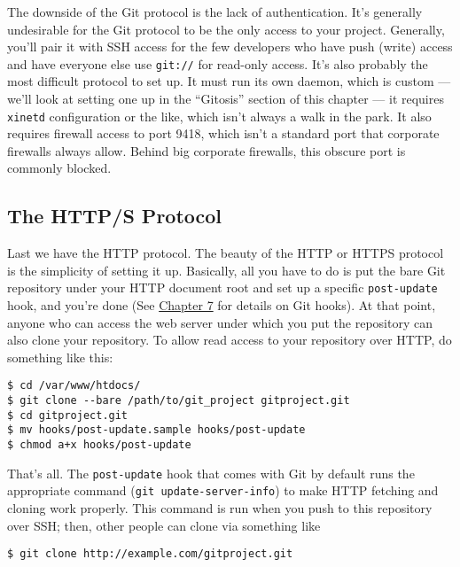 \documentclass[a4paper]{book}
\newcommand{\prechap}{Chapter }
\newcommand{\postchap}{}
\newcommand{\chapref}[1]{\hyperref[chap:#1]{\prechap #1\postchap}}
\begin{document}
The downside of the Git protocol is the lack of authentication. It's generally undesirable for the Git protocol to be the only access to your project. Generally, you'll pair it with SSH access for the few developers who have push (write) access and have everyone else use \texttt{git://} for read-only access. It's also probably the most difficult protocol to set up. It must run its own daemon, which is custom --- we'll look at setting one up in the “Gitosis” section of this chapter --- it requires \texttt{xinetd} configuration or the like, which isn't always a walk in the park. It also requires firewall access to port 9418, which isn't a standard port that corporate firewalls always allow. Behind big corporate firewalls, this obscure port is commonly blocked.

\subsection{The HTTP/S Protocol}\label{the-https-protocol}

Last we have the HTTP protocol. The beauty of the HTTP or HTTPS protocol is the simplicity of setting it up. Basically, all you have to do is put the bare Git repository under your HTTP document root and set up a specific \texttt{post-update} hook, and you're done (See \chapref{7} for details on Git hooks). At that point, anyone who can access the web server under which you put the repository can also clone your repository. To allow read access to your repository over HTTP, do something like this:

\begin{shaded}\begin{verbatim}
$ cd /var/www/htdocs/
$ git clone --bare /path/to/git_project gitproject.git
$ cd gitproject.git
$ mv hooks/post-update.sample hooks/post-update
$ chmod a+x hooks/post-update
\end{verbatim}\end{shaded}

That's all. The \texttt{post-update} hook that comes with Git by default runs the appropriate command (\texttt{git update-server-info}) to make HTTP fetching and cloning work properly. This command is run when you push to this repository over SSH; then, other people can clone via something like

\begin{shaded}\begin{verbatim}
$ git clone http://example.com/gitproject.git
\end{verbatim}\end{shaded}
\end{document}
